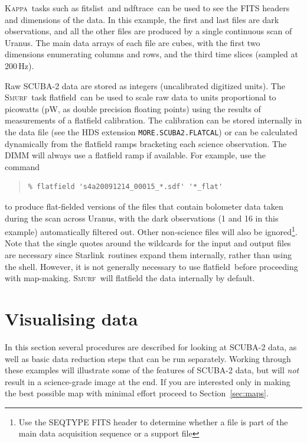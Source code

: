 \documentclass[twoside,11pt]{article}
\newcommand{\htmladdnormallink}[2]{#1}
\newcommand{\xref}[3]{#1}
\newcommand{\xlabel}[1]{}
\renewcommand{\_}{\texttt{\symbol{95}}}
\newenvironment{myquote}{\begin{quote}\begin{small}}{\end{small}\end{quote}}
\newcommand{\starlink}{\htmladdnormallink{Starlink}{http://starlink.jach.hawaii.edu}}
\newcommand{\Kappa}{\xref{\textsc{Kappa}}{sun95}{}}
\newcommand{\smurf}{\xref{\textsc{Smurf}}{sun258}{}}
\newcommand{\task}[1]{\textsf{#1}}
\newcommand{\flatfield}{\xref{\task{flatfield}}{sun258}{FLATFIELD}}
\newcommand{\fitslist}{\xref{\task{fitslist}}{sun95}{FITSLIST}}
\newcommand{\ndftrace}{\xref{\task{ndftrace}}{sun95}{NDFTRACE}}
\begin{document}
\Kappa\ tasks such as \fitslist\ and \ndftrace\ can be used to see the
FITS headers and dimensions of the data. In this example, the first
and last files are dark observations, and all the other files are
produced by a single continuous scan of Uranus. The main data arrays
of each file are cubes, with the first two dimensions enumerating
columns and rows, and the third time slices (sampled at 200\,Hz).

Raw SCUBA-2 data are stored as integers (uncalibrated digitized
units). The \smurf\ task \flatfield\ can be used to scale raw data to
units proportional to picowatts (pW, as double precision floating
points) using the results of measurements of a flatfield
calibration. The calibration can be stored internally in the data file
(see the HDS extension \texttt{MORE.SCUBA2.FLATCAL}) or can be
calculated dynamically from the flatfield ramps bracketing each
science observation. The DIMM will always use a flatfield ramp if
available. For example, use the command

\begin{myquote}
\begin{verbatim}
% flatfield 's4a20091214_00015_*.sdf' '*_flat'
\end{verbatim}
\end{myquote}
%
to produce flat-fielded versions of the files that contain bolometer
data taken during the scan across Uranus, with the dark observations
(1 and 16 in this example) automatically filtered out. Other
non-science files will also be ignored\footnote{Use the SEQ\_TYPE FITS
  header to determine whether a file is part of the main data
  acquisition sequence or a support file}. Note that the single quotes
around the wildcards for the input and output files are necessary
since \starlink\ routines expand them internally, rather than using
the shell. However, it is not generally necessary to use \flatfield\
before proceeding with map-making. \smurf\ will flatfield the data
internally by default.

\section{\xlabel{time_series}Visualising data}
\label{sec:visual}

In this section several procedures are described for looking at
SCUBA-2 data, as well as basic data reduction steps that can be run
separately. Working through these examples will illustrate some of the
features of SCUBA-2 data, but will {\em not} result in a science-grade
image at the end. If you are interested only in making the best
possible map with minimal effort proceed to Section~\ref{sec:maps}.
\end{document}
